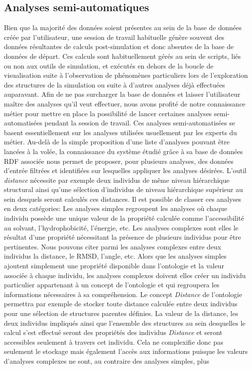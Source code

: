 \subsection{Analyses semi-automatiques}

Bien que la majorité des données soient présentes au sein de la base de données créée par l'utilisateur, une session de travail habituelle génère souvent des données résultantes de calculs post-simulation et donc absentes de la base de données de départ. Ces calculs sont habituellement gérés au sein de scripts, liés ou non aux outils de simulation, et exécutés en dehors de la boucle de visualisation suite à l'observation de phénomènes particuliers lors de l'exploration des structures de la simulation ou suite à d'autres analyses déjà effectuées auparavant. Afin de ne pas surcharger la base de données et laisser l'utilisateur maître des analyses qu'il veut effectuer, nous avons profité de notre connaissance métier pour mettre en place la possibilité de lancer certaines analyses semi-automatisées pendant la session de travail. Ces analyses semi-automatisées se basent essentiellement sur les analyses utilisées usuellement par les experts du métier. Au-delà de la simple proposition d'une liste d'analyses pouvant être lancées à la volée, la connaissance du système étudié grâce à sa base de données RDF associée nous permet de proposer, pour plusieurs analyses, des données d'entrée filtrées et identifiées sur lesquelles appliquer les analyses désirées. L'outil \textit{distance} nécessite par exemple deux individus de même niveau hiérarchique structural ainsi qu'une sélection d'individus de niveau hiérarchique supérieur au sein desquels seront calculés ces distances. Il est possible de classer ces analyses en deux catégories: Les analyses simples regroupent les analyses où chaque individu possède une unique valeur de la propriété calculée comme l'accessibilité au solvant, l'hydrophobicité, l'énergie, etc. Les analyses complexes sont elles le résultat d'une propriété nécessitant la présence de plusieurs individus pour être pertinentes. Nous pouvons citer parmi les analyses complexes entre deux individus la distance, le RMSD, l'angle, etc.
Alors que les analyses simples ajoutent simplement une propriété disponible dans l'ontologie et la valeur associée à chaque individu, les analyses complexes doivent elles créer un individu particulier appartenant à un concept de l'ontologie et qui regroupera les informations nécessaires à sa compréhension. Le concept \textit{Distance} de l'ontologie permettra par exemple de stocker toute distance calculée entre deux individus pour une sélection de structures parentes définies. La valeur de la distance, les deux individus impliqués ainsi que l'ensemble des structures au sein desquelles le calcul s'est effectué seront des propriétés des individus \textit{Distance} et seront accessibles seulement à travers cet individu. Cela ne complexifie donc pas seulement le stockage mais également l'accès aux informations puisque les valeurs d'analyses complexes ne sont, au contraire des analyses simples, plus
